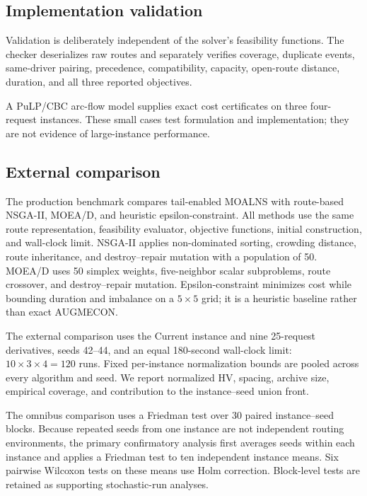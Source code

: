 \documentclass[11pt,a4paper]{article}
\newcommand{\MOALNS}{MOALNS}
\begin{document}
\subsection{Implementation validation}

Validation is deliberately independent of the solver's feasibility functions.
The checker deserializes raw routes and separately verifies coverage, duplicate
events, same-driver pairing, precedence, compatibility, capacity, open-route
distance, duration, and all three reported objectives.

A PuLP/CBC arc-flow model supplies exact cost certificates on three
four-request instances. These small cases test formulation and implementation;
they are not evidence of large-instance performance.

\subsection{External comparison}

The production benchmark compares tail-enabled \MOALNS{} with route-based
NSGA-II, MOEA/D, and heuristic epsilon-constraint. All methods use the same
route representation, feasibility evaluator, objective functions, initial
construction, and wall-clock limit. NSGA-II applies non-dominated sorting,
crowding distance, route inheritance, and destroy--repair mutation with a
population of 50. MOEA/D uses 50 simplex weights, five-neighbor scalar
subproblems, route crossover, and destroy--repair mutation. Epsilon-constraint
minimizes cost while bounding duration and imbalance on a $5\times5$ grid; it
is a heuristic baseline rather than exact AUGMECON.

The external comparison uses the Current instance and nine 25-request
derivatives, seeds 42--44, and an equal 180-second wall-clock limit:
$10\times3\times4=120$ runs. Fixed
per-instance normalization bounds are pooled across every algorithm and seed.
We report normalized HV, spacing, archive size, empirical coverage, and
contribution to the instance--seed union front.

The omnibus comparison uses a Friedman test over 30 paired instance--seed
blocks. Because repeated seeds from one instance are not independent routing
environments, the primary confirmatory analysis first averages seeds within
each instance and applies a Friedman test to ten independent instance means.
Six pairwise Wilcoxon tests on these means use Holm correction. Block-level
tests are retained as supporting stochastic-run analyses.
\end{document}
